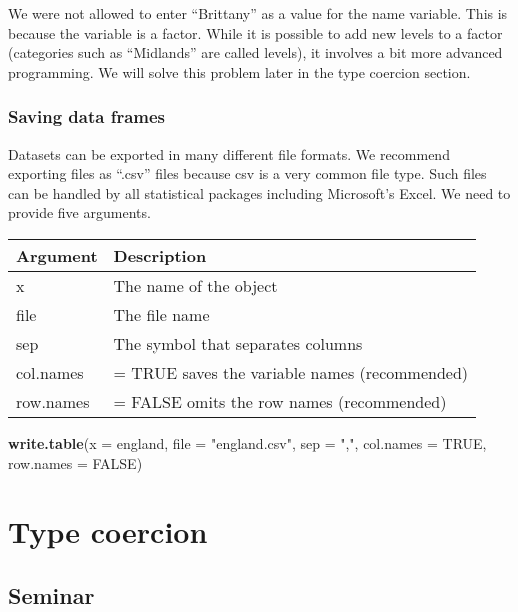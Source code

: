 \documentclass[]{article}
\newenvironment{Shaded}{\begin{snugshade}}{\end{snugshade}}
\newcommand{\DataTypeTok}[1]{\textcolor[rgb]{0.13,0.29,0.53}{#1}}
\newcommand{\KeywordTok}[1]{\textcolor[rgb]{0.13,0.29,0.53}{\textbf{#1}}}
\newcommand{\NormalTok}[1]{#1}
\newcommand{\OtherTok}[1]{\textcolor[rgb]{0.56,0.35,0.01}{#1}}
\newcommand{\StringTok}[1]{\textcolor[rgb]{0.31,0.60,0.02}{#1}}
\begin{document}
We were not allowed to enter ``Brittany'' as a value for the name variable. This is because the variable is a factor. While it is possible to add new levels to a factor (categories such as ``Midlands'' are called levels), it involves a bit more advanced programming. We will solve this problem later in the type coercion section.

\hypertarget{saving-data-frames}{%
\subsubsection{Saving data frames}\label{saving-data-frames}}

Datasets can be exported in many different file formats. We recommend exporting files as ``.csv'' files because csv is a very common file type. Such files can be handled by all statistical packages including Microsoft's Excel. We need to provide five arguments.

\begin{longtable}[]{@{}ll@{}}
\toprule
Argument & Description\tabularnewline
\midrule
\endhead
x & The name of the object\tabularnewline
file & The file name\tabularnewline
sep & The symbol that separates columns\tabularnewline
col.names & = TRUE saves the variable names (recommended)\tabularnewline
row.names & = FALSE omits the row names (recommended)\tabularnewline
\bottomrule
\end{longtable}

\begin{Shaded}
\begin{Highlighting}[]
\KeywordTok{write.table}\NormalTok{(}\DataTypeTok{x =}\NormalTok{ england, }\DataTypeTok{file =} \StringTok{"england.csv"}\NormalTok{, }\DataTypeTok{sep =} \StringTok{","}\NormalTok{, }\DataTypeTok{col.names =} \OtherTok{TRUE}\NormalTok{, }\DataTypeTok{row.names =} \OtherTok{FALSE}\NormalTok{)}
\end{Highlighting}
\end{Shaded}

\hypertarget{type-coercion}{%
\section{Type coercion}\label{type-coercion}}

\hypertarget{seminar-3}{%
\subsection{Seminar}\label{seminar-3}}
\end{document}

